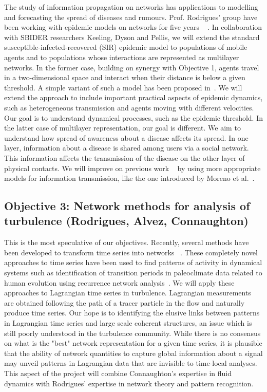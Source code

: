 The study of information propagation on networks has applications to modelling and forecasting the spread of diseases and rumours.
Prof. Rodrigues' group have been working with epidemic models on networks for five years ~
\cite{Arruda014, Arruda017}. In collaboration with SBIDER researchers Keeling, Dyson and Pellis, 
we will extend the standard susceptible-infected-recovered (SIR) epidemic model to populations of mobile agents and to populations 
whose interactions are represented as multilayer networks. In the former case, 
building on synergy with Objective 1, agents travel in a two-dimensional 
space and interact when their distance is below a given threshold. A
simple variant of such a model has been proposed in~\cite{Buscarino08}.
We will extend the approach to include important practical aspects of epidemic 
dynamics, such as heterogeneous transmission and agents moving with different 
velocities. Our goal is to understand dynamical processes, such as the epidemic threshold. 
In the latter case of multilayer representation, our goal is different. We aim to understand how
spread of awareness about a disease affects its spread. In one layer, 
information about a disease is shared among users via a social network. 
This information affects the transmission of the disease on the other layer of physical 
contacts. We will improve on previous work ~\cite{Funk09, Granell013} by using more appropriate models for information 
transmission, like the one introduced by Moreno et al.~\cite{Moreno04}. 



\subsection{Objective 3: Network methods for analysis of turbulence (Rodrigues, Alvez, 
Connaughton)}
This is the most speculative of our objectives. Recently, several methods have been 
developed to transform time series into networks ~\cite{Lacasa08, Donner010}. These completely novel approaches to time series have been used 
to find patterns of activity in dynamical systems such as identification of transition periods in 
paleoclimate data related to human evolution using recurrence network analysis~\cite{Donges011}.  
We will apply these approaches to Lagrangian time series in turbulence. Lagrangian measurements are obtained following the path of a tracer particle in the flow and naturally produce time series. Our hope is
 to identifying the elusive links between patterns in Lagrangian time series and large scale coherent
 structures, an issue which is still poorly understood in the turbulence community. While there is 
 no consensus on what is the "best" network representation for a given time series, it is plausible
 that the ability of network quantities to capture global information about a signal may unveil
 patterns in Lagrangian data that are invisible to time-local analyses. This aspect of the project will
 combine Connaughton's expertise in fluid dynamics with Rodrigues' expertise in network theory
 and pattern recognition.

